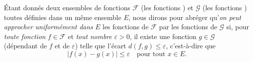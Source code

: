 {Étant donnés deux ensembles de fonctions $\mathscr{F}$ (les fonctions ) et $\mathscr{G}$ (les fonctions ) toutes définies dans un même ensemble $E$, nous dirons pour abréger qu'\emph{on peut approcher uniformément dans} $E$ les fonctions de $\mathscr{F}$ par les fonctions de $\mathscr{G}$ si, pour \emph{toute fonction} $f \in \mathscr{F}$ et \emph{tout nombre} $\varepsilon > 0$, il existe une fonction $g \in \mathscr{G}$ (dépendant de $f$ et de $\varepsilon$) telle que l'écart $d(f,g) \leqslant \varepsilon$, c'est-à-dire que 
$$|f(x) - g(x)| \leqslant \varepsilon \quad \text{pour tout } x \in E.$$
}

\begin{marginfigure}[-10cm]
    
\end{marginfigure}
